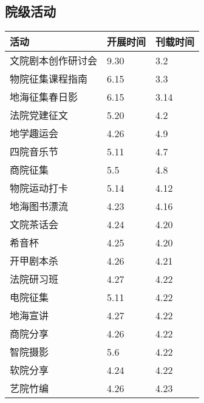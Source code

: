 \documentclass[letterpaper, 12pt]{article}
\begin{document}
\begin{multicols}{2}
\section{院级活动}
\begin{tabular}{|>{\centering\arraybackslash}m{}|m{}|m{}|}
\hline
    活动 & 开展时间 & 刊载时间\\
    \hline\hline
    文院剧本创作研讨会 & 9.30 & 3.2\\
    物院征集课程指南 & 6.15 & 3.3\\
    地海征集春日影 & 6.15 & 3.14\\
    法院党建征文 & 5.20 & 4.2\\
    地学趣运会 & 4.26 & 4.9\\
    四院音乐节 & 5.11 & 4.7\\
    商院征集 & 5.5 & 4.8\\
    物院运动打卡 & 5.14 & 4.12\\
    地海图书漂流 & 4.23 & 4.16\\
    文院茶话会 & 4.24 & 4.20\\
    希音杯 & 4.25 & 4.20\\
    开甲剧本杀 & 4.26 & 4.21\\
    法院研习班 & 4.27 & 4.22\\
    电院征集 & 5.11 & 4.22\\
    地海宣讲 & 4.27 & 4.22\\
    商院分享 & 4.26 & 4.22\\
    智院摄影 & 5.6 & 4.22\\
    软院分享 & 4.24 & 4.22\\
    艺院竹编 & 4.26 & 4.23\\
    \hline
\end{tabular}




\end{multicols}
\end{document}
